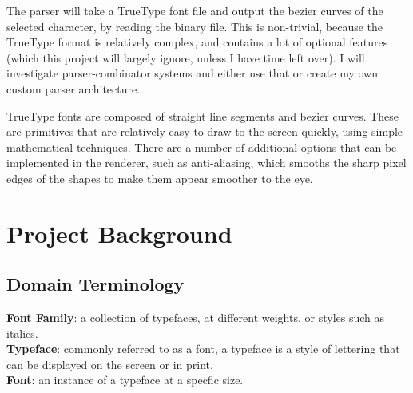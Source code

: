 \documentclass{report}
\begin{document}
The parser will take a TrueType font file and output the bezier curves of the
selected character, by reading the binary file. This is non-trivial, because the
TrueType format is relatively complex, and contains a lot of optional features
(which this project will largely ignore, unless I have time left over). I will
investigate parser-combinator systems and either use that or create my own
custom parser architecture.

TrueType fonts are composed of straight line segments and bezier curves. These
are primitives that are relatively easy to draw to the screen quickly, using
simple mathematical techniques. There are a number of additional options that
can be implemented in the renderer, such as anti-aliasing, which smooths the
sharp pixel edges of the shapes to make them appear smoother to the eye.



\newpage
\section{Project Background}

\subsection{Domain Terminology}
\textbf{Font Family}: a collection of typefaces, at different weights, or styles
such as italics.
\\

\textbf{Typeface}: commonly referred to as a font, a typeface is a style of
lettering that can be displayed on the screen or in print.
\\

\textbf{Font}: an instance of a typeface at a specfic size.
\\
\end{document}
